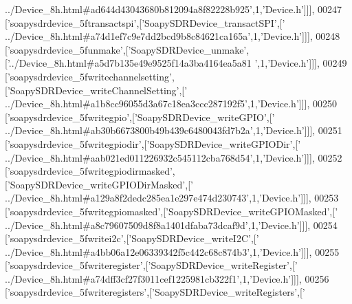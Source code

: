 \begin{DoxyCode}
{      ../Device\_8h.html#ad644d43043680b812094a8f82228b925'},1,\textcolor{stringliteral}{'Device.h'}]]],
00247   [\textcolor{stringliteral}{'soapysdrdevice\_5ftransactspi'},[\textcolor{stringliteral}{'SoapySDRDevice\_transactSPI'},[\textcolor{stringliteral}{'
      ../Device\_8h.html#a74d1ef7c9e7dd2bcd9b8c84621ca165a'},1,\textcolor{stringliteral}{'Device.h'}]]],
00248   [\textcolor{stringliteral}{'soapysdrdevice\_5funmake'},[\textcolor{stringliteral}{'SoapySDRDevice\_unmake'},[\textcolor{stringliteral}{'../Device\_8h.html#a5d7b135e49e9525f14a3ba4164ea5a81
      '},1,\textcolor{stringliteral}{'Device.h'}]]],
00249   [\textcolor{stringliteral}{'soapysdrdevice\_5fwritechannelsetting'},[\textcolor{stringliteral}{'SoapySDRDevice\_writeChannelSetting'},[\textcolor{stringliteral}{'
      ../Device\_8h.html#a1b8cc96055d3a67c18ea3ccc287192f5'},1,\textcolor{stringliteral}{'Device.h'}]]],
00250   [\textcolor{stringliteral}{'soapysdrdevice\_5fwritegpio'},[\textcolor{stringliteral}{'SoapySDRDevice\_writeGPIO'},[\textcolor{stringliteral}{'
      ../Device\_8h.html#ab30b6673800b49b439c6480043fd7b2a'},1,\textcolor{stringliteral}{'Device.h'}]]],
00251   [\textcolor{stringliteral}{'soapysdrdevice\_5fwritegpiodir'},[\textcolor{stringliteral}{'SoapySDRDevice\_writeGPIODir'},[\textcolor{stringliteral}{'
      ../Device\_8h.html#aab021ed011226932c545112cba768d54'},1,\textcolor{stringliteral}{'Device.h'}]]],
00252   [\textcolor{stringliteral}{'soapysdrdevice\_5fwritegpiodirmasked'},[\textcolor{stringliteral}{'SoapySDRDevice\_writeGPIODirMasked'},[\textcolor{stringliteral}{'
      ../Device\_8h.html#a129a8f2dedc285ea1e297e474d230743'},1,\textcolor{stringliteral}{'Device.h'}]]],
00253   [\textcolor{stringliteral}{'soapysdrdevice\_5fwritegpiomasked'},[\textcolor{stringliteral}{'SoapySDRDevice\_writeGPIOMasked'},[\textcolor{stringliteral}{'
      ../Device\_8h.html#a8c79607509d8f8a1401dfaba73dcaf9d'},1,\textcolor{stringliteral}{'Device.h'}]]],
00254   [\textcolor{stringliteral}{'soapysdrdevice\_5fwritei2c'},[\textcolor{stringliteral}{'SoapySDRDevice\_writeI2C'},[\textcolor{stringliteral}{'
      ../Device\_8h.html#a4bb06a12e06339342f5c442c68c874b3'},1,\textcolor{stringliteral}{'Device.h'}]]],
00255   [\textcolor{stringliteral}{'soapysdrdevice\_5fwriteregister'},[\textcolor{stringliteral}{'SoapySDRDevice\_writeRegister'},[\textcolor{stringliteral}{'
      ../Device\_8h.html#a74dff3cf27f3011cef1225981cb322f1'},1,\textcolor{stringliteral}{'Device.h'}]]],
00256   [\textcolor{stringliteral}{'soapysdrdevice\_5fwriteregisters'},[\textcolor{stringliteral}{'SoapySDRDevice\_writeRegisters'},[\textcolor{stringliteral}{'
}
\end{DoxyCode}
